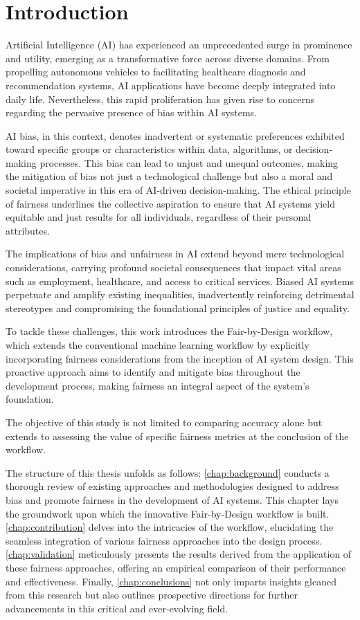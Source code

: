 \chapter{Introduction}
\label{chap:introduction}

Artificial Intelligence (AI) has experienced an unprecedented surge in prominence and utility, emerging as a transformative force across diverse domains. From propelling autonomous vehicles to facilitating healthcare diagnosis and recommendation systems, AI applications have become deeply integrated into daily life. Nevertheless, this rapid proliferation has given rise to concerns regarding the pervasive presence of bias within AI systems.

AI bias, in this context, denotes inadvertent or systematic preferences exhibited toward specific groups or characteristics within data, algorithms, or decision-making processes. This bias can lead to unjust and unequal outcomes, making the mitigation of bias not just a technological challenge but also a moral and societal imperative in this era of AI-driven decision-making. The ethical principle of fairness underlines the collective aspiration to ensure that AI systems yield equitable and just results for all individuals, regardless of their personal attributes.

The implications of bias and unfairness in AI extend beyond mere technological considerations, carrying profound societal consequences that impact vital areas such as employment, healthcare, and access to critical services. Biased AI systems perpetuate and amplify existing inequalities, inadvertently reinforcing detrimental stereotypes and compromising the foundational principles of justice and equality.

To tackle these challenges, this work introduces the Fair-by-Design workflow, which extends the conventional machine learning workflow by explicitly incorporating fairness considerations from the inception of AI system design. This proactive approach aims to identify and mitigate bias throughout the development process, making fairness an integral aspect of the system's foundation.

The objective of this study is not limited to comparing accuracy alone but extends to assessing the value of specific fairness metrics at the conclusion of the workflow.

The structure of this thesis unfolds as follows: \cref{chap:background} conducts a thorough review of existing approaches and methodologies designed to address bias and promote fairness in the development of AI systems. This chapter lays the groundwork upon which the innovative Fair-by-Design workflow is built. \cref{chap:contribution} delves into the intricacies of the workflow, elucidating the seamless integration of various fairness approaches into the design process. \cref{chap:validation} meticulously presents the results derived from the application of these fairness approaches, offering an empirical comparison of their performance and effectiveness. Finally, \cref{chap:conclusions} not only imparts insights gleaned from this research but also outlines prospective directions for further advancements in this critical and ever-evolving field.

